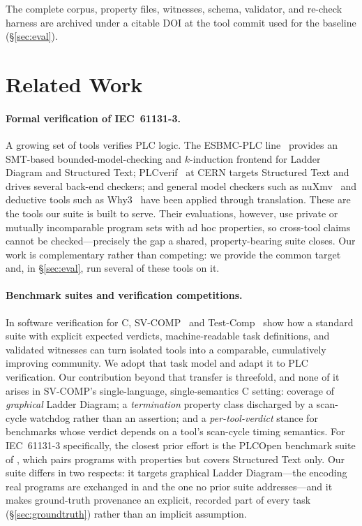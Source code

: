 \medskip\noindent
The complete corpus, property files, witnesses, schema, validator, and re-check harness are
archived under a citable DOI at the tool commit used for the baseline (\S\ref{sec:eval}).

\section{Related Work}
\label{sec:related}

\paragraph{Formal verification of IEC~61131-3.}
A growing set of tools verifies PLC logic. The ESBMC-PLC line~\citep{dantas_esbmc-plc_2026-3,dantas_esbmc-graphplc_2026,dantas_esbmc-plc_2026-1}
provides an SMT-based bounded-model-checking and $k$-induction frontend for Ladder Diagram and
Structured Text; PLCverif~\citep{tournier_plcverif_2022,fink_verifying_2024} at CERN targets Structured Text and drives
several back-end checkers; and general model checkers such as nuXmv~\citep{cavada_nuxmv_2014} and deductive
tools such as Why3~\citep{why3} have been applied through translation. These are the tools our
suite is built to serve. Their evaluations, however, use private or mutually incomparable
program sets with ad hoc properties, so cross-tool claims cannot be checked---precisely the gap
a shared, property-bearing suite closes. Our work is complementary rather than competing: we
provide the common target and, in \S\ref{sec:eval}, run several of these tools on it.

\paragraph{Benchmark suites and verification competitions.}
In software verification for C, SV-COMP~\citep{beyer_state_2024} and Test-Comp~\citep{testcomp} show how a
standard suite with explicit expected verdicts, machine-readable task definitions, and validated
witnesses can turn isolated tools into a comparable, cumulatively improving community. We adopt
that task model and adapt it to PLC verification. Our contribution beyond that transfer is
threefold, and none of it arises in SV-COMP's single-language, single-semantics C setting:
coverage of \emph{graphical} Ladder Diagram; a \emph{termination} property class discharged by a
scan-cycle watchdog rather than an assertion; and a \emph{per-tool-verdict} stance for benchmarks
whose verdict depends on a tool's scan-cycle timing semantics. For IEC~61131-3 specifically, the closest prior
effort is the PLCOpen benchmark suite of \citet{ukegbu_benchmarks_2023}, which pairs
programs with properties but covers Structured Text only. Our suite differs in two respects: it
targets graphical Ladder Diagram---the encoding real programs are exchanged in and the one no
prior suite addresses---and it makes ground-truth provenance an explicit, recorded part of every
task (\S\ref{sec:groundtruth}) rather than an implicit assumption.

